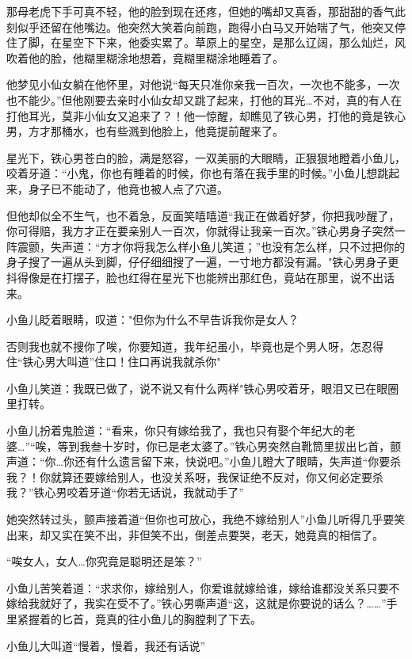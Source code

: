 \documentclass[12pt,oneside]{book}
\begin{document}
那母老虎下手可真不轻，他的脸到现在还疼，但她的嘴却又真香，那甜甜的香气此刻似乎还留在他嘴边。他突然大笑着向前跑，跑得小白马又开始喘了气，他突又停住了脚，在星空下下来，他委实累了。草原上的星空，是那么辽阔，那么灿烂，风吹着他的脸，他糊里糊涂地想着，竟糊里糊涂地睡着了。

他梦见小仙女躺在他怀里，对他说``每天只准你亲我一百次，一次也不能多，一次也不能少。''但他刚要去亲时小仙女却又跳了起来，打他的耳光\ldots 不对，真的有人在打他耳光，莫非小仙女又追来了？！他一惊醒，却瞧见了铁心男，打他的竟是铁心男，方才那桶水，也有些溅到他脸上，他竟提前醒来了。

星光下，铁心男苍白的脸，满是怒容，一双美丽的大眼睛，正狠狠地瞪着小鱼儿，咬着牙道：``小鬼，你也有睡着的时候，你也有落在我手里的时候。''小鱼儿想跳起来，身子已不能动了，他竟也被人点了穴道。

但他却似全不生气，也不着急，反面笑嘻嘻道``我正在做着好梦，你把我吵醒了，你可得赔，我方才正在要亲别人一百次，你就得让我亲一百次。''铁心男身子突然一阵震颤，失声道：``方才你将我怎么样小鱼儿笑道；''也没有怎么样，只不过把你的身子搜了一遍从头到脚，仔仔细细搜了一遍，一寸地方都没有漏。"铁心男身子更抖得像是在打摆子，脸也红得在星光下也能辨出那红色，竟站在那里，说不出话来。

小鱼儿眨着眼睛，叹道："但你为什么不早告诉我你是女人？

否则我也就不搜你了唉，你要知道，我年纪虽小，毕竟也是个男人呀，怎忍得住``铁心男大叫道''住口！住口再说我就杀你"

小鱼儿笑道：我既已做了，说不说又有什么两样"铁心男咬着牙，眼泪又已在眼圈里打转。

小鱼儿扮着鬼脸道：``看来，你只有嫁给我了，我也只有娶个年纪大的老婆\ldots{}''``唉，等到我叁十岁时，你已是老太婆了。''铁心男突然自靴筒里拔出匕首，颤声道：``你\ldots 你还有什么遗言留下来，快说吧。''小鱼儿瞪大了眼睛，失声道``你要杀我？！你就算还要嫁给别人，也没关系呀，我保证绝不反对，你又何必定要杀我？''铁心男咬着牙道``你若无话说，我就动手了''

她突然转过头，颤声接着道``但你也可放心，我绝不嫁给别人''小鱼儿听得几乎要笑出来，却又实在笑不出，非但笑不出，倒差点要哭，老天，她竟真的相信了。

``唉女人，女人\ldots 你究竟是聪明还是笨？''

小鱼儿苦笑着道：``求求你，嫁给别人，你爱谁就嫁给谁，嫁给谁都没关系只要不嫁给我就好了，我实在受不了。''铁心男嘶声道``这，这就是你要说的话么？\ldots\ldots{}''手里紧握着的匕首，竟真的往小鱼儿的胸膛刺了下去。

小鱼儿大叫道``慢着，慢着，我还有话说''
\end{document}

